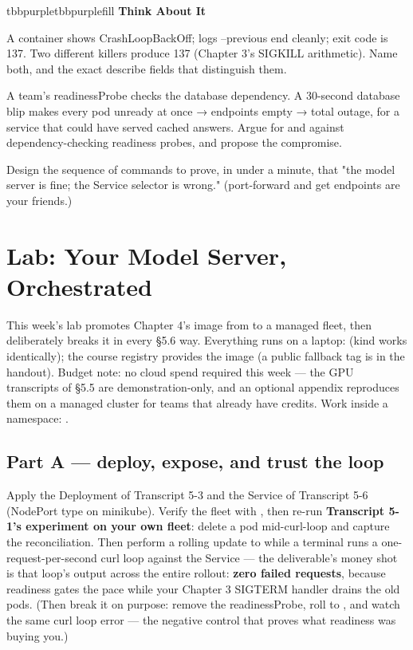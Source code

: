 \vspace{3.0pt}

\begin{calloutbox}{tbbpurple}{tbbpurplefill}
{\normalsize\bfseries\color{tbbpurple}Think About It}\par\vspace{3pt}
\begin{tbbitemize}
  \item A container shows CrashLoopBackOff; logs --previous end cleanly; exit code is 137. Two different killers produce 137 (Chapter 3's SIGKILL arithmetic). Name both, and the exact describe fields that distinguish them.
  \item A team's readinessProbe checks the database dependency. A 30-second database blip makes every pod unready at once → endpoints empty → total outage, for a service that could have served cached answers. Argue for and against dependency-checking readiness probes, and propose the compromise.
  \item Design the sequence of commands to prove, in under a minute, that "the model server is fine; the Service selector is wrong." (port-forward and get endpoints are your friends.)
\end{tbbitemize}
\end{calloutbox}

\section{Lab: Your Model Server, Orchestrated}

This week's lab promotes Chapter 4's image from  to a managed fleet, then deliberately breaks it in every §5.6 way. Everything runs on a laptop:  (kind works identically); the course registry provides the image (a public fallback tag is in the handout). Budget note: no cloud spend required this week — the GPU transcripts of §5.5 are demonstration-only, and an optional appendix reproduces them on a managed cluster for teams that already have credits. Work inside a namespace: .

\subsection*{Part A — deploy, expose, and trust the loop}

Apply the Deployment of Transcript 5-3 and the Service of Transcript 5-6 (NodePort type on minikube). Verify the fleet with , then re-run \textbf{Transcript 5-1's experiment on your own fleet}: delete a pod mid-curl-loop and capture the reconciliation. Then perform a rolling update to  while a terminal runs a one-request-per-second curl loop against the Service — the deliverable's money shot is that loop's output across the entire rollout: \textbf{zero failed requests}, because readiness gates the pace while your Chapter 3 SIGTERM handler drains the old pods. (Then break it on purpose: remove the readinessProbe, roll to , and watch the same curl loop error — the negative control that proves what readiness was buying you.)

